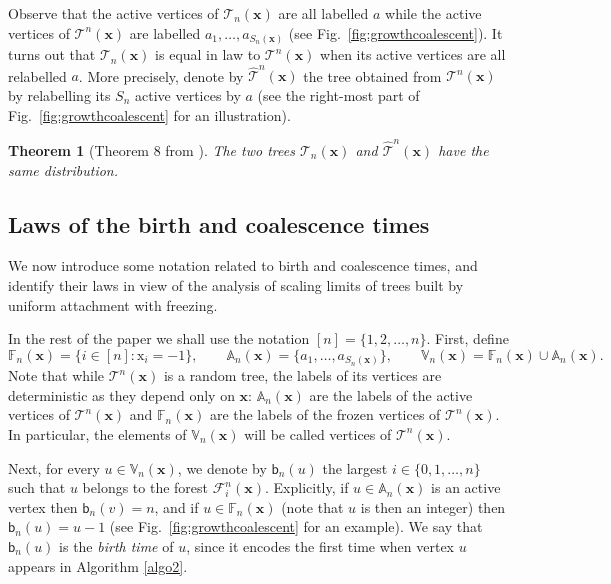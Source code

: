 \documentclass[11pt]{article}
\theoremstyle{plain}
\newtheorem{theorem}{Theorem}[section]
\theoremstyle{definition}
\theoremstyle{remark}
\newcommand{\1}{\mathbbm{1}} %
\newcommand{\T}{\mathcal{T}} %
\newcommand{\F}{\mathcal{F}} %
\newcommand{\birth}{\mathsf{b}} %
\newcommand{\Xb}{\mathrm{\mathbf{x}}} %
\newcommand{\X}{\mathrm x} %
\newcommand{\V}{\mathbb{V}} %
\newcommand{\Fbb}{\mathbb{F}} %
\newcommand{\A}{\mathbb{A}} %
\begin{document}
\bigskip

Observe that the active vertices of $\T_n(\Xb)$ are all labelled $a$ while the active vertices of $\T^n(\Xb)$ are labelled $a_{1}, \ldots,a_{S_{n}(\Xb)}$ (see Fig.~\ref{fig:growthcoalescent}). It turns out that  $\T_n(\Xb)$ is equal in law to  $\T^n(\Xb)$ when its active vertices are all relabelled $a$. More precisely, denote by $\hat{\T}^n(\Xb)$ the tree obtained from $\T^n(\Xb)$ by relabelling its $S_{n}$ active vertices by $a$ (see the right-most part of Fig.~\ref{fig:growthcoalescent} for an illustration).

\begin{theorem}[Theorem 8 from \cite{BBKK23+}]
\label{thm:samelaw}
The two trees  $\T_n(\Xb)$ and $\hat{\T}^n(\Xb)$ have the same distribution.
\end{theorem}

 
\subsection{Laws of the birth and coalescence times}
\label{ssec:laws of birth and coal}

We now introduce some notation related to birth and coalescence times, and identify their laws in view of the analysis of scaling limits of trees built by uniform attachment with freezing.


{In the rest of the paper we shall use the notation $[n]= \{1,2, \ldots,n\}$.}  First, define
\begin{equation}
\label{eq:labels}
\Fbb_{n}(\Xb) =  \{i \in [n]: \X_{i}=-1\},  \qquad \A_{n}(\Xb)=  \{a_{1}, \ldots, a_{S_{n}(\Xb)}\}, \qquad   \V_{n}(\Xb)= \Fbb_{n}(\Xb) \cup \A_{n}(\Xb).\end{equation}
Note that while $\T^n(\Xb)$ is a random tree, the labels of its vertices are deterministic as they depend only on $\Xb$: $ \A_{n}(\Xb)$ are the labels of the active vertices of  $\T^n(\Xb)$ and $\Fbb_{n}(\Xb)$ are the labels of the frozen vertices of $\T^{n}(\Xb)$. In particular, the elements of $\V_{n}(\Xb)$ will be called vertices of $\T^n(\Xb)$.


Next, for every $u \in \V_{n}(\Xb)$, we denote by $\birth_n(u)$ the largest $i \in \{0,1,\ldots,n\}$ such that $u$ belongs to the forest $\F^n_i(\Xb)$. Explicitly, if $u \in \A_{n}(\Xb)$ is an active vertex then $\birth_n(v)=n$, and if $u \in \Fbb_{n}(\Xb)$ (note that $u$ is then an integer) then $\birth_n(u)=u-1$ (see Fig.~\ref{fig:growthcoalescent} for an example). We say that $\birth_n(u)$ is the \emph{birth time} of $u$, since it encodes the first time when vertex $u$ appears in Algorithm \ref{algo2}.
\end{document}
